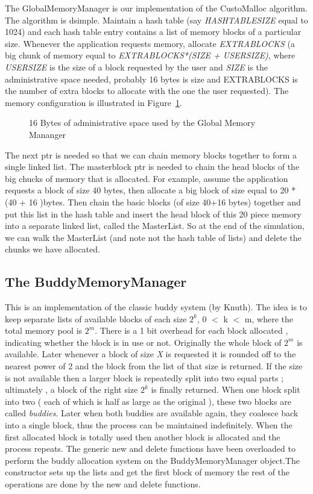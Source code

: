 \documentclass[11pt]{report}
\begin{document}
The GlobalMemoryManager is our implementation of the CustoMalloc
algorithm. The algorithm is dsimple. Maintain a hash table (say
{\it HASHTABLESIZE} equal to 1024) and each hash table entry contains a
list of memory blocks of a particular size. Whenever the application
requests memory, allocate {\it EXTRABLOCKS} (a big chunk of memory
equal to {\it EXTRABLOCKS*(SIZE + USERSIZE)}, where {\it USERSIZE} is
the size of a block requested by the user and {\it SIZE} is the
administrative space needed, probably 16 bytes is size and EXTRABLOCKS
is the number of extra blocks to allocate with the one the user
requested). The memory configuration is illustrated in
Figure~\ref{fig:gMemMgrFig}. 

\begin{figure}
\centerline{}
\caption{16 Bytes of administrative space used by the Global Memory Mananger}\label{fig:gMemMgrFig}
\end{figure}

The next ptr is needed so that we can chain memory blocks together to form
a single linked list. The masterblock ptr is needed to chain the head
blocks of the big chucks of memory that is allocated. For example, assume
the application requests a block of size 40 bytes, then allocate a big
block of size equal to 20 * (40 + 16 )bytes. Then chain the basic blocks
(of size 40+16 bytes) together and put this list in the hash table and
insert the head block of this 20 piece memory into a separate linked list,
called the MasterList. So at the end of the simulation, we can walk the
MasterList (and note not the hash table of lists) and delete the chunks we
have allocated.

\subsection{The BuddyMemoryManager}

This is an implementation of the classic buddy system (by Knuth). The idea
is to keep separate lists of available blocks of each size $2^{k}$, 0 $<$
k $<$ m, where the total memory pool is $2^{m}$. There is a 1 bit overhead
for each block allocated , indicating whether the block is in use or
not. Originally the whole block of $2^{m}$ is available. Later whenever a
block of size {\it X} is requested it is rounded off to the nearest power
of 2 and the block from the list of that size is returned. If the size is
not available then a larger block is repeatedly split into two equal parts
; ultimately , a block of the right size $2^{k}$ is finally returned. When
one block split into two ( each of which is half as large as the original
), these two blocks are called {\it buddies}. Later when both buddies are
available again, they coalesce back into a single block, thus the process
can be maintained indefinitely. When the first allocated block is totally
used then another block is allocated and the process repeats. The generic
{\sf new} and {\sf delete} functions have been overloaded to perform the
buddy allocation system on the BuddyMemoryManager object.The constructor
sets up the lists and get the first block of memory the rest of the
operations are done by the new and delete functions.
\end{document}
